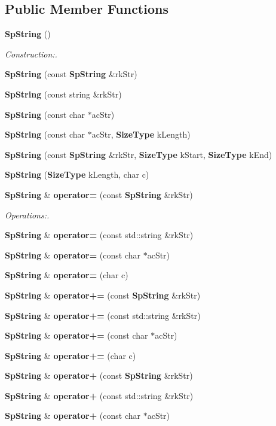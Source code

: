 \subsection*{Public Member Functions}
\begin{CompactItemize}
\item 
{\bf Sp\-String} ()
\begin{CompactList}\small\item\em Construction:. \item\end{CompactList}\item 
{\bf Sp\-String} (const {\bf Sp\-String} \&rk\-Str)
\item 
{\bf Sp\-String} (const string \&rk\-Str)
\item 
{\bf Sp\-String} (const char $\ast$ac\-Str)
\item 
{\bf Sp\-String} (const char $\ast$ac\-Str, {\bf Size\-Type} k\-Length)
\item 
{\bf Sp\-String} (const {\bf Sp\-String} \&rk\-Str, {\bf Size\-Type} k\-Start, {\bf Size\-Type} k\-End)
\item 
{\bf Sp\-String} ({\bf Size\-Type} k\-Length, char c)
\item 
{\bf Sp\-String} \& {\bf operator=} (const {\bf Sp\-String} \&rk\-Str)
\begin{CompactList}\small\item\em Operations:. \item\end{CompactList}\item 
{\bf Sp\-String} \& {\bf operator=} (const std::string \&rk\-Str)
\item 
{\bf Sp\-String} \& {\bf operator=} (const char $\ast$ac\-Str)
\item 
{\bf Sp\-String} \& {\bf operator=} (char c)
\item 
{\bf Sp\-String} \& {\bf operator+=} (const {\bf Sp\-String} \&rk\-Str)
\item 
{\bf Sp\-String} \& {\bf operator+=} (const std::string \&rk\-Str)
\item 
{\bf Sp\-String} \& {\bf operator+=} (const char $\ast$ac\-Str)
\item 
{\bf Sp\-String} \& {\bf operator+=} (char c)
\item 
{\bf Sp\-String} \& {\bf operator+} (const {\bf Sp\-String} \&rk\-Str)
\item 
{\bf Sp\-String} \& {\bf operator+} (const std::string \&rk\-Str)
\item 
{\bf Sp\-String} \& {\bf operator+} (const char $\ast$ac\-Str)

\end{CompactItemize}
